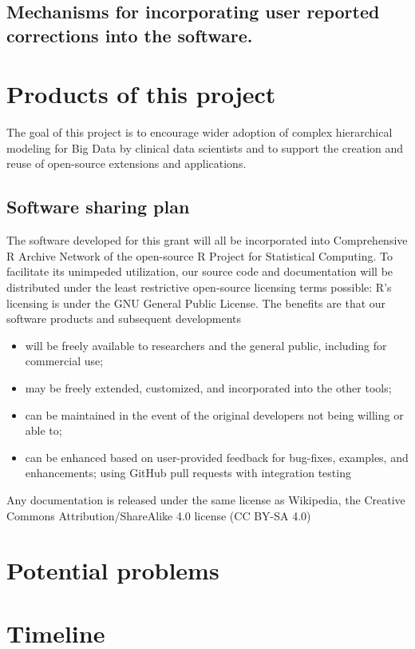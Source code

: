 \documentclass[11pt,notitlepage]{article}
\begin{document}
\subsection*{Mechanisms for incorporating user reported corrections into the software.}

\section*{Products of this project}
The goal of this project is to encourage wider adoption of complex hierarchical modeling for Big Data by clinical data scientists and to support the creation and reuse of open-source extensions and applications. 

\subsection*{Software sharing plan}
The software developed for this grant will all be incorporated into Comprehensive R Archive Network of the open-source R Project for Statistical Computing. To facilitate its unimpeded utilization, our source code and documentation will be distributed under the least restrictive open-source licensing terms possible: R's licensing is under the GNU General Public License. The benefits are that our software products and subsequent developments

\begin{itemize}
\item 
 will be freely available to researchers and the general public, including for commercial use; 
\item
 may be freely extended, customized, and incorporated into the other tools; 
\item 
can be maintained in the event of the original developers not being willing
or able to; 
\item 
can be enhanced based on user-provided feedback for bug-fixes, examples, and enhancements; using GitHub pull requests with integration testing
\end{itemize}

Any documentation is released under the same license as Wikipedia, the Creative Commons Attribution/ShareAlike 4.0 license (CC BY-SA 4.0)\cite{Creativecommonsorg2015}

\section*{Potential problems}
\section*{Timeline}
\end{document}
